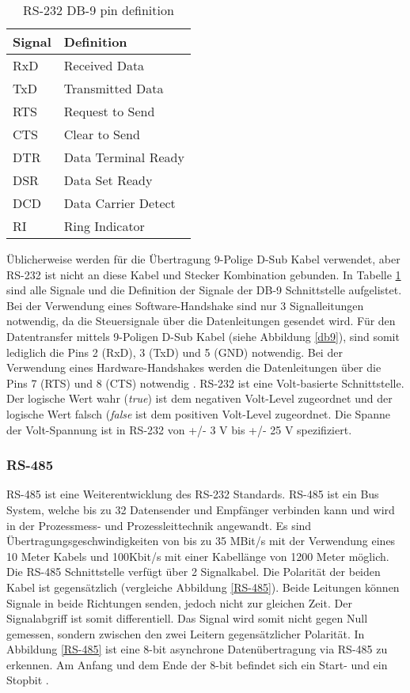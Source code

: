 \documentclass[
fontsize=12pt, 
paper=a4, 
BCOR=10mm, 
twoside=false,
 DIV=10, 
 headsepline, 
 footsepline
 ]{scrartcl}
\begin{document}
\begin{table}[h]
\caption{RS-232 DB-9 pin definition \cite[S. 223]{hughes2010real}}
\begin{center}

\begin{tabularx}{1\textwidth}{XX}
\hline
Signal & Definition \\
\hline
RxD & Received Data \\
TxD & Transmitted Data\\
RTS & Request to Send \\
CTS & Clear to Send \\
DTR & Data Terminal Ready \\
DSR & Data Set Ready \\
DCD & Data Carrier Detect \\
RI & Ring Indicator \\
\hline
\end{tabularx}
\end{center}
\label{db8pindef}
\end{table}

Üblicherweise werden für die Übertragung 9-Polige D-Sub Kabel verwendet, aber RS-232 ist nicht an diese Kabel und Stecker Kombination gebunden. In Tabelle \ref{db8pindef} sind alle Signale und die Definition der Signale der DB-9 Schnittstelle aufgelistet. Bei der Verwendung eines Software-Handshake sind nur 3 Signalleitungen notwendig, da die Steuersignale über die Datenleitungen gesendet wird. Für den Datentransfer mittels 9-Poligen D-Sub Kabel (siehe Abbildung \ref{db9}), sind somit lediglich die Pins 2 (RxD), 3 (TxD) und 5 (GND) notwendig. Bei der Verwendung eines Hardware-Handshakes werden die Datenleitungen über die Pins 7 (RTS) und 8 (CTS) notwendig \cite{db9}. RS-232 ist eine Volt-basierte Schnittstelle. Der logische Wert wahr (\textit{true}) ist dem negativen Volt-Level zugeordnet und der logische Wert falsch (\textit{false} ist dem positiven Volt-Level zugeordnet. Die Spanne der Volt-Spannung ist in RS-232 von +/- 3 V bis +/- 25 V spezifiziert.

\subsubsection{RS-485}

RS-485 ist eine Weiterentwicklung des RS-232 Standards. RS-485 ist ein Bus System, welche bis zu 32 Datensender und Empfänger verbinden kann und wird in der Prozessmess- und Prozessleittechnik angewandt. Es sind Übertragungsgeschwindigkeiten von bis zu 35 MBit/s mit der Verwendung eines 10 Meter Kabels und 100Kbit/s mit einer Kabellänge von 1200 Meter möglich. Die RS-485 Schnittstelle verfügt über 2 Signalkabel. Die Polarität der beiden Kabel ist gegensätzlich (vergleiche Abbildung \ref{RS-485}). Beide Leitungen können Signale in beide Richtungen senden, jedoch nicht zur gleichen Zeit. Der Signalabgriff ist somit differentiell. Das Signal wird somit nicht gegen Null gemessen, sondern zwischen den zwei Leitern gegensätzlicher Polarität. In Abbildung \ref{RS-485} ist eine 8-bit asynchrone Datenübertragung via RS-485 zu erkennen. Am Anfang und dem Ende der 8-bit befindet sich ein Start- und ein Stopbit \cite[S. 222 f.]{hughes2010real}.
\end{document}
